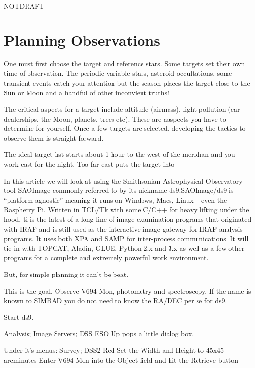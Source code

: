 \documentclass[letter,11pt,oneside]{article}
\def\documentisdraft{NOTDRAFT}
\begin{document}

\setcounter{section}{0}

\ifx\documentisdraft\drafttest
\linenumbers    %
\fi

\section{Planning Observations}

One must first choose the target and reference stars. Some targets
set their own time of observation. The periodic variable stars,
asteroid occultations, some transient events catch your attention
but the season places the target close to the Sun or Moon and
a handful of other inconvient truths!

The critical aspects for a target include altitude (airmass), light
pollution (car dealerships, the Moon, planets, trees etc). These are
aaspects you have to determine for yourself. Once a few targets
are selected, developing the tactics to observe them is straight forward.


The ideal target list starts about 1 hour to the west of the meridian
and you work east for the night. Too far east puts the target into


In this article we will look at using the Smithsonian Astrophysical
Observatory tool SAOImage commonly referred to by its nickname
ds9.SAOImage/ds9 is ``platform agnostic'' meaning it runs on Windows,
Macs, Linux -- even the Raspherry Pi. Written in TCL/Tk with some
C/C++ for heavy lifting under the hood, ti is the latest of a long
line of image examination programs that originated with IRAF and is
still used as the interactive image gateway for IRAF analysis
programs.  It uses both XPA and SAMP for inter-process
communications. It will tie in with TOPCAT, Aladin, GLUE, Python 2.x
and 3.x as well as a few other programs for a complete and extremely
powerful work environment.

But, for simple planning it can't be beat.

This is the goal. Observe V694 Mon, photometry and spectroscopy.
If the name is known to SIMBAD you do not need to know the
RA/DEC per se for ds9.


Start ds9.

Analysis; Image Servers; DSS ESO
Up pops a little dialog box.

Under it's menus:
Survey; DSS2-Red
Set the Width and Height to 45x45 arcminutes
Enter V694 Mon into the Object field
and hit the Retrieve button
\end{document}
